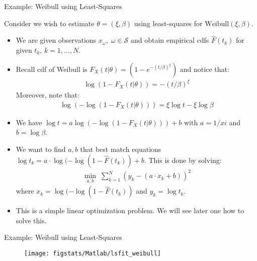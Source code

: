 \documentclass[9pt]{beamer}
\begin{document}
%
\begin{frame}{Example: Weibull using Least-Squares}

Consider we wish to estimate $\theta=(\xi,\beta)$ using least-squares for $\textrm{Weibull}(\xi,\beta)$. 
\begin{itemize}
\item We are given observations $x_\omega,\; \omega \in \mathcal{S}$ and obtain empirical cdfs $\hat{F}(t_k)$ for given $t_k,\, k=1,...,N$. 
\item Recall cdf of Weibull is $F_X(t|\theta)=(1-e^{-(t/\beta)^\xi})$ and notice that:
\begin{align*}
\log(1-F_X(t|\theta))=-(t/\beta)^\xi
\end{align*}
Moreover, note that:
\begin{align*}
\log(-\log(1-F_X(t|\theta)))= \xi \log t-\xi \log \beta
\end{align*}
\item We have $\log t=a\log(-\log(1-F_X(t|\theta)))+b$ with $a=1/xi$ and $b=\log\beta$. 
\item We want to find $a,b$ that best match equations $\log t_k=a\cdot \log(-\log(1-\hat{F}(t_k))+b$. This is done by solving:
\begin{align*}
\min_{a,b}\; \sum_{k=1}^N\left (y_k-(a\cdot x_k+b)\right)^2
\end{align*}
where $x_k=\log(-\log(1-\hat{F}(t_k))$ and $y_k=\log t_k$. 
\item This is a simple linear optimization problem. We will see later one how to solve this. 
\end{itemize}


\end{frame}

%
\begin{frame}{Example: Weibull using Least-Squares}

\begin{figure}[!htb]
    \centering
	\texttt{[image: figstats/Matlab/lsfit\_weibull]}
\end{figure}

\end{frame}
\end{document}
